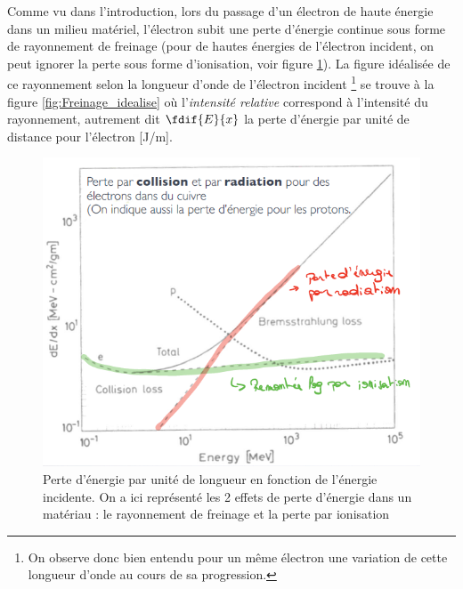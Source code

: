 Comme vu dans l'introduction, lors du passage d'un électron de haute énergie dans un milieu matériel, l'électron subit une perte d'énergie continue sous forme de rayonnement de freinage (pour de hautes énergies de l'électron incident, on peut ignorer la perte sous forme d'ionisation, voir figure \ref{fig:Resume_pertes}). La figure idéalisée de ce rayonnement selon la longueur d'onde de l'électron incident \footnote{On observe donc bien entendu pour un même électron une variation de cette longueur d'onde au cours de sa progression.} se trouve à la figure \ref{fig:Freinage_idealise} où l'\textit{intensité relative} correspond à l'intensité du rayonnement, autrement dit $\fdif{E}{x}$ la perte d'énergie par unité de distance pour l'électron [J/m].
\begin{figure}[tph]
    \centering
    \includegraphics[scale=0.8]{Images2/RésuméPerte.PNG}
    \caption{Perte d'énergie par unité de longueur en fonction de l'énergie incidente. On a ici représenté les 2 effets de perte d'énergie dans un matériau : le rayonnement de freinage et la perte par ionisation}
    \label{fig:Resume_pertes}
\end{figure}
